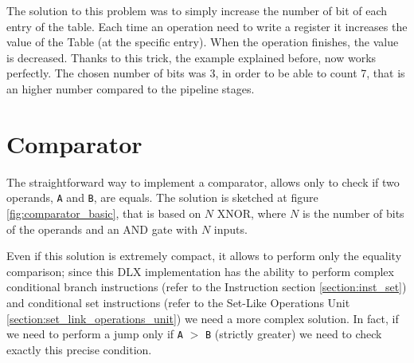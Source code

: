 The solution to this problem was to simply increase the number of bit of each entry of the table. Each time an operation need to write a register it increases the value of the Table (at the specific entry). When the operation finishes, the value is decreased. Thanks to this trick, the example explained before, now works perfectly. 
The chosen number of bits was 3, in order to be able to count 7, that is an higher number compared to the pipeline stages. 

\section{Comparator}
\label{sec:comparator}
The straightforward way to implement a comparator, allows only to check if two operands, \texttt{A} and \texttt{B}, are equals. The solution is sketched at figure \ref{fig:comparator_basic}, that is based on $N$ XNOR, where $N$ is the number of bits of the operands and an AND gate with $N$ inputs.

Even if this solution is extremely compact, it allows to perform only the equality comparison; since this DLX implementation has the ability to perform complex conditional branch instructions (refer to the Instruction section \ref{section:inst_set}) and conditional set instructions (refer to the Set-Like Operations Unit \ref{section:set_link_operations_unit}) we need a more complex solution. In fact, if we need to perform a jump only if \texttt{A} $>$ \texttt{B} (strictly greater) we need to check exactly this precise condition.

